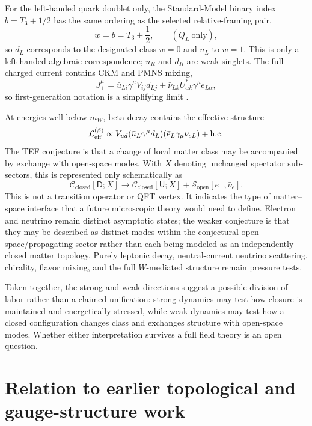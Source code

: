 \documentclass[aps,prd,reprint,superscriptaddress,nofootinbib,longbibliography,floatfix]{revtex4-2}
\newcommand{\Ustate}{\mathsf{U}}
\newcommand{\Dstate}{\mathsf{D}}
\newcommand{\Cclosed}{\mathcal{C}_{\mathrm{closed}}}
\newcommand{\Sopen}{\mathcal{S}_{\mathrm{open}}}
\begin{document}
For the left-handed quark doublet only, the Standard-Model binary index $b=T_3+1/2$ has the same ordering as the selected relative-framing pair,
\begin{equation}
w=b=T_3+\frac12,
\qquad (Q_L\ \text{only}),
\label{eq:wisb}
\end{equation}
so $d_L$ corresponds to the designated class $w=0$ and $u_L$ to $w=1$. This is only a left-handed algebraic correspondence; $u_R$ and $d_R$ are weak singlets. The full charged current contains CKM and PMNS mixing,
\begin{equation}
J_+^\mu=
\bar u_{Li}\gamma^\mu V_{ij}d_{Lj}
+\bar\nu_{Lk}U^*_{\alpha k}\gamma^\mu e_{L\alpha},
\label{eq:chargedcurrent}
\end{equation}
so first-generation notation is a simplifying limit \cite{PDG2026}.

At energies well below $m_W$, beta decay contains the effective structure
\begin{equation}
\mathcal L_{\rm eff}^{(\beta)}\propto
V_{ud}(\bar u_L\gamma^\mu d_L)
(\bar e_L\gamma_\mu\nu_{eL})+\mathrm{h.c.}
\label{eq:betaeff}
\end{equation}
The TEF conjecture is that a change of local matter class may be accompanied by exchange with open-space modes. With $X$ denoting unchanged spectator sub-sectors, this is represented only schematically as
\begin{equation}
\Cclosed[\Dstate;X]
\longrightarrow
\Cclosed[\Ustate;X]
+\Sopen[e^-,\bar\nu_e].
\label{eq:closedopen}
\end{equation}
This is not a transition operator or QFT vertex. It indicates the type of matter--space interface that a future microscopic theory would need to define. Electron and neutrino remain distinct asymptotic states; the weaker conjecture is that they may be described as distinct modes within the conjectural open-space/propagating sector rather than each being modeled as an independently closed matter topology. Purely leptonic decay, neutral-current neutrino scattering, chirality, flavor mixing, and the full $W$-mediated structure remain pressure tests.

Taken together, the strong and weak directions suggest a possible division of labor rather than a claimed unification: strong dynamics may test how closure is maintained and energetically stressed, while weak dynamics may test how a closed configuration changes class and exchanges structure with open-space modes. Whether either interpretation survives a full field theory is an open question.
\section{Relation to earlier topological and gauge-structure work}
\label{sec:literature}
\end{document}

